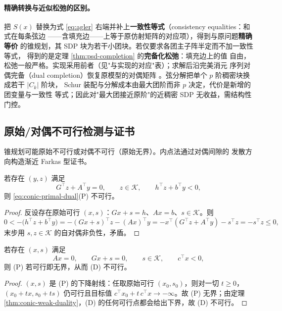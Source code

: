\paragraph{精确转换与近似松弛的区别。}把 $S(x)$ 替换为式 \eqref{eq:agler}
右端并补上\textbf{一致性等式}（consistency equalities：和式在每条弦边
——含填充边——上等于原仿射矩阵的对应项），得到与原问题\textbf{精确等价}
的锥规划，其 SDP 块为若干小团块。若仅要求各团主子阵半定而不加一致性等式，
得到的是定理 \ref{thm:psd-completion} 的\textbf{完备化松弛}：填充边上的值
自由，松弛一般严格。实现采用前者（见"与实现的对应"表）；求解后沿完美消元
序列对偶完备（dual completion）恢复原模型的对偶矩阵
\cite{fukuda2001}。弦分解把单个 $p$ 阶稠密块换成若干 $|C_k|$ 阶块，
Schur 装配与分解成本由最大团阶而非 $p$ 决定，代价是新增的团变量与一致性
等式；因此对"最大团接近原阶"的近稠密 SDP 无收益，需结构性门控。

\subsection{原始/对偶不可行检测与证书}

锥规划可能原始不可行或对偶不可行（原始无界）。内点法通过对偶间隙的
发散方向构造渐近 Farkas 型证书。

\begin{theorem}[原始不可行证书]
\label{thm:conic-primal-infeas}
若存在 $(y, z)$ 满足
\[
G^\top z + A^\top y = 0, \qquad z \in \mathcal{K}, \qquad h^\top z + b^\top y < 0,
\]
则 \eqref{eq:conic-primal-dual}(P) 不可行。
\end{theorem}
\begin{proof}
反设存在原始可行 $(x, s)$：$Gx + s = h$、$Ax = b$、$s \in \mathcal{K}$。则
\[
0 < -\big(h^\top z + b^\top y\big)
= -(Gx + s)^\top z - (Ax)^\top y
= -x^\top(G^\top z + A^\top y) - s^\top z = -s^\top z \le 0,
\]
末步用 $s, z \in \mathcal{K}$ 的自对偶非负性，矛盾。
\end{proof}

\begin{theorem}
\label{thm:conic-dual-infeas}
若存在 $(x, s)$ 满足
\[
Ax = 0, \qquad Gx + s = 0, \qquad s \in \mathcal{K}, \qquad c^\top x < 0,
\]
则 (P) 若可行即无界，从而 (D) 不可行。
\end{theorem}
\begin{proof}
$(x, s)$ 是 (P) 的下降射线：任取原始可行 $(x_0, s_0)$，则对一切
$t \ge 0$，$(x_0 + tx, s_0 + ts)$ 仍可行且目标值
$c^\top x_0 + t\, c^\top x \to -\infty$。故 (P) 无界；由定理
\ref{thm:conic-weak-duality}，(D) 的任何可行点都会给出下界，故 (D) 不可行。
\end{proof}


